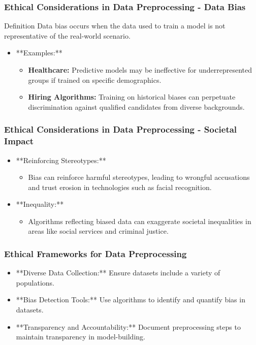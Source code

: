 \documentclass[aspectratio=169]{beamer}
\begin{document}
\begin{frame}[fragile]
    \frametitle{Ethical Considerations in Data Preprocessing - Data Bias}
    \begin{block}{Definition}
        Data bias occurs when the data used to train a model is not representative of the real-world scenario.
    \end{block}
    \begin{itemize}
        \item **Examples:**
            \begin{itemize}
                \item \textbf{Healthcare:} Predictive models may be ineffective for underrepresented groups if trained on specific demographics.
                \item \textbf{Hiring Algorithms:} Training on historical biases can perpetuate discrimination against qualified candidates from diverse backgrounds.
            \end{itemize}
    \end{itemize}
\end{frame}

\begin{frame}[fragile]
    \frametitle{Ethical Considerations in Data Preprocessing - Societal Impact}
    \begin{itemize}
        \item **Reinforcing Stereotypes:** 
            \begin{itemize}
                \item Bias can reinforce harmful stereotypes, leading to wrongful accusations and trust erosion in technologies such as facial recognition.
            \end{itemize}
        \item **Inequality:**
            \begin{itemize}
                \item Algorithms reflecting biased data can exaggerate societal inequalities in areas like social services and criminal justice.
            \end{itemize}
    \end{itemize}
\end{frame}

\begin{frame}[fragile]
    \frametitle{Ethical Frameworks for Data Preprocessing}
    \begin{itemize}
        \item **Diverse Data Collection:** Ensure datasets include a variety of populations.
        \item **Bias Detection Tools:** Use algorithms to identify and quantify bias in datasets.
        \item **Transparency and Accountability:** Document preprocessing steps to maintain transparency in model-building.
    \end{itemize}
\end{frame}
\end{document}
